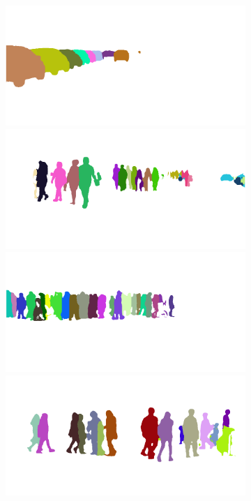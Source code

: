 \begin{figure}[p]
{{\begin{subfigure}[t]{0.24\linewidth}
\begin{center}
		\includegraphics[width=\linewidth,trim={0px 60px 0 0px},clip]{results/segnet_43_output_3.png}
		\includegraphics[width=\linewidth,trim={0px 60px 0 0px},clip]{results/segnet_204_output_3.png}
		\includegraphics[width=\linewidth,trim={0px 60px 0 0px},clip]{results/segnet_149_output_3.png}
		\includegraphics[width=\linewidth,trim={0px 60px 0 0px},clip]{results/segnet_128_output_3.png}

\end{center}
\end{subfigure}}}
\end{figure}
